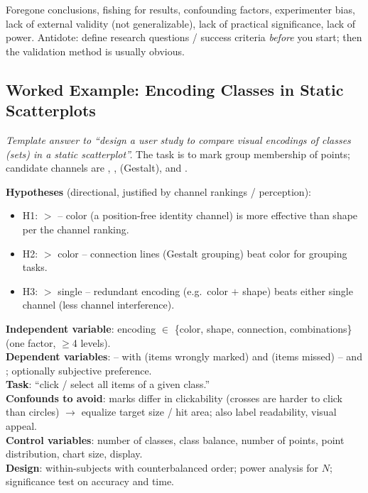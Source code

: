 \begin{pitfall}
Foregone conclusions, fishing for results, confounding factors, experimenter
bias, lack of external validity (not generalizable), lack of practical
significance, lack of power. Antidote: define research questions / success
criteria \emph{before} you start; then the validation method is usually obvious.
\end{pitfall}

\subsection{Worked Example: Encoding Classes in Static Scatterplots}

\emph{Template answer to ``design a user study to compare visual encodings of
classes (sets) in a static scatterplot''.} The task is to mark group membership
of points; candidate channels are , , 
(Gestalt), and .

\begin{keybox}
\textbf{Hypotheses} (directional, justified by channel rankings / perception):
\begin{itemize}
  \item H1:  $>$  -- color (a position-free identity
        channel) is more effective than shape per the channel ranking.
  \item H2:  $>$ color -- connection lines (Gestalt grouping)
        beat color for grouping tasks.
  \item H3:  $>$ single -- redundant encoding (e.g.\
        color $+$ shape) beats either single channel (less channel interference).
\end{itemize}
\textbf{Independent variable}: encoding $\in$ \{color, shape, connection,
combinations\} (one factor, $\geq$4 levels).\\
\textbf{Dependent variables}:  -- with 
(items wrongly marked) and \term{false negatives} (items missed) -- and
\term{task completion time}; optionally subjective preference.\\
\textbf{Task}: ``click / select all items of a given class.''\\
\textbf{Confounds to avoid}: marks differ in clickability (crosses are harder to
click than circles) $\rightarrow$ equalize target size / hit area; also label
readability, visual appeal.\\
\textbf{Control variables}: number of classes, class balance, number of points,
point distribution, chart size, display.\\
\textbf{Design}: within-subjects with counterbalanced order; power analysis for
$N$; significance test on accuracy and time.
\end{keybox}

